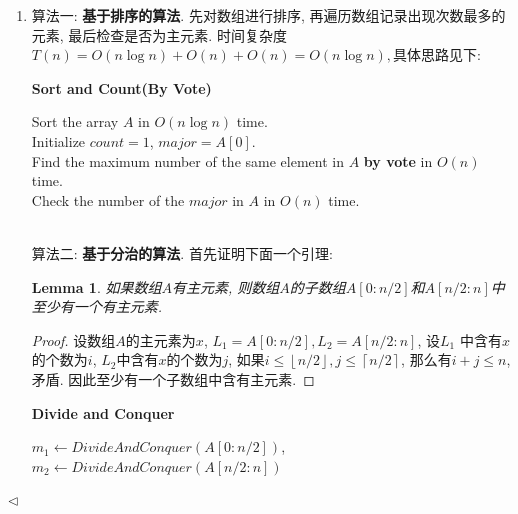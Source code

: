 \documentclass[11pt]{article}
\newtheorem{lemma}[theorem]{Lemma}
\newenvironment{answer}[1][Answer]{\begin{trivlist}
\item[\hskip \labelsep{\bfseries\itshape#1.}\hskip \labelsep]}{\hfill$\lhd$\end{trivlist}}
\begin{document}
\begin{answer}
    \begin{enumerate}[label = (\arabic*)]
        \item 算法一: \textbf{基于排序的算法}. 先对数组进行排序, 再遍历数组记录出现次数最多的元素, 最后检查是否为主元素.
        时间复杂度$T(n) = O(n \log n) + O(n) + O(n)= O(n \log n), $具体思路见下:
        \begin{algorithm}\footnotesize
            \caption{\textbf{Sort and Count(By Vote)}}
            Sort the array $A$ in $O(n \log n)$ time. \\
            Initialize $count = 1$, $major = A[0]$.\\
            Find the maximum number of the same element in $A$ \textbf{by vote} in $O(n)$ time.\\
            Check the number of the $major$ in $A$ in $O(n)$ time.\\
        \end{algorithm}
        \\算法二: \textbf{基于分治的算法}. 首先证明下面一个引理:
        \begin{lemma}
            如果数组$A$有主元素, 则数组$A$的子数组$A[0:n/2]$和$A[n/2:n]$中至少有一个有主元素.
        \end{lemma} 
        \begin{proof}
            设数组$A$的主元素为$x$, $L_1 = A[0:n/2], L_2 = A[n/2: n]$, 设$L_1$ 中含有$x$的个数为$i$, $L_2$中含有$x$的个数为$j$,
            如果$i \le \left\lfloor n/2 \right\rfloor, j \le \left\lceil n/2 \right\rceil$, 那么有$i + j \le n$, 矛盾. 因此至少有一个子数组中含有主元素.
        \end{proof}
        \begin{algorithm}\footnotesize
            \caption{\textbf{Divide and Conquer}}
            $m_1 \leftarrow DivideAndConquer(A[0:n/2])$, $m_2 \leftarrow DivideAndConquer(A[n/2:n])$\\
\end{algorithm}
\end{enumerate}
\end{answer}
\end{document}
